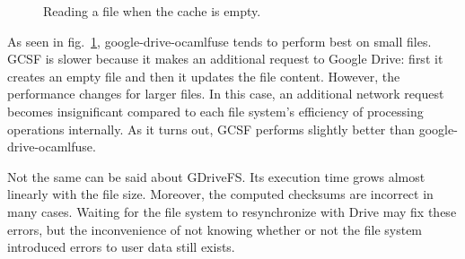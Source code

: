 \begin{figure}[bpt]
\centering
{}
\caption{Reading a file when the cache is empty.}
\label{fig:fresh_read_benchmark}
\end{figure}

As seen in fig.~\ref{fig:fresh_read_benchmark}, google-drive-ocamlfuse tends to perform best on small files. GCSF is slower because it makes an additional request to Google Drive: first it creates an empty file and then it updates the file content. However, the performance changes for larger files. In this case, an additional network request becomes insignificant compared to each file system's efficiency of processing operations internally. As it turns out, GCSF performs slightly better than google-drive-ocamlfuse.

Not the same can be said about GDriveFS. Its execution time grows almost linearly with the file size. Moreover, the computed checksums are incorrect in many cases. Waiting for the file system to resynchronize with Drive may fix these errors, but the inconvenience of not knowing whether or not the file system introduced errors to user data still exists.

